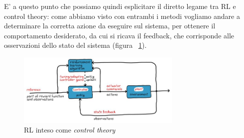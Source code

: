 E' a questo punto che possiamo quindi esplicitare il diretto legame tra RL e control theory: come abbiamo visto con entrambi i metodi vogliamo andare a determinare la corretta azione da eseguire sul sistema, per ottenere il comportamento desiderato, da cui si ricava il feedback, che corrisponde alle osservazioni dello stato del sistema (figura ~\ref{fig:RL_Control}).

\begin{figure}[!h]
	\centering
	\includegraphics[width=0.7\textwidth]{Immagini/RL_Control.JPG}
	\caption{RL inteso come \textit{control theory}}
	\label{fig:RL_Control}
\end{figure}